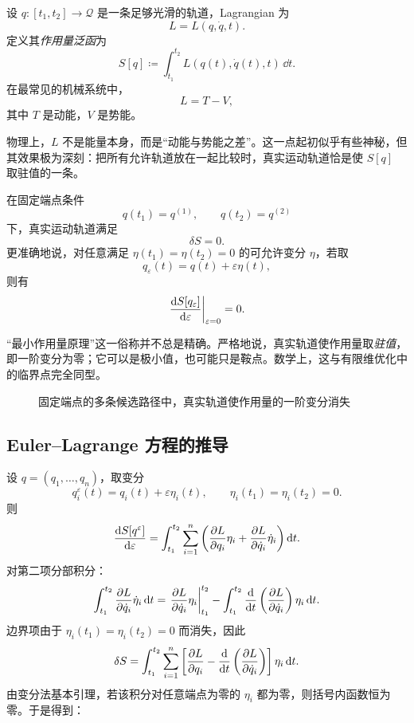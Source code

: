 \begin{definition}[作用量泛函]
设 $q:[t_1,t_2]\to \mathcal Q$ 是一条足够光滑的轨道，Lagrangian 为
\[
  L=L(q,\dot q,t).
\]
定义其\emph{作用量泛函}为
\[
  S[q]\coloneqq \int_{t_1}^{t_2} L(q(t),\dot q(t),t)\,\dd t.
\]
在最常见的机械系统中，
\[
  L=T-V,
\]
其中 $T$ 是动能，$V$ 是势能。
\end{definition}

物理上，$L$ 不是能量本身，而是“动能与势能之差”。这一点起初似乎有些神秘，但其效果极为深刻：把所有允许轨道放在一起比较时，真实运动轨道恰是使 $S[q]$ 取驻值的一条。

\begin{law}[Hamilton 原理]
在固定端点条件
\[
  q(t_1)=q^{(1)},\qquad q(t_2)=q^{(2)}
\]
下，真实运动轨道满足
\[
  \delta S =0.
\]
更准确地说，对任意满足 $\eta(t_1)=\eta(t_2)=0$ 的可允许变分 $\eta$，若取
\[
  q_\varepsilon(t)=q(t)+\varepsilon \eta(t),
\]
则有
\[
  \left.\dv{S[q_\varepsilon]}{\varepsilon}\right|_{\varepsilon=0}=0.
\]
\end{law}

\begin{remark}
“最小作用量原理”这一俗称并不总是精确。严格地说，真实轨道使作用量取\emph{驻值}，即一阶变分为零；它可以是极小值，也可能只是鞍点。数学上，这与有限维优化中的临界点完全同型。
\end{remark}

\begin{figure}[htbp]
\centering
{}
\caption{固定端点的多条候选路径中，真实轨道使作用量的一阶变分消失}
\end{figure}

\subsection{Euler--Lagrange 方程的推导}

设 $q=(q_1,\dots,q_n)$，取变分
\[
  q_i^\varepsilon(t)=q_i(t)+\varepsilon \eta_i(t),
  \qquad
  \eta_i(t_1)=\eta_i(t_2)=0.
\]
则
\[
  \dv{S[q^\varepsilon]}{\varepsilon}
  =\int_{t_1}^{t_2}\sum_{i=1}^n\left(
    \pdv{L}{q_i}\eta_i + \pdv{L}{\dot q_i}\dot\eta_i
  \right)\dd t.
\]
对第二项分部积分：
\[
  \int_{t_1}^{t_2}\pdv{L}{\dot q_i}\dot\eta_i\,\dd t
  =\eval{\pdv{L}{\dot q_i}\eta_i}_{t_1}^{t_2}
  -\int_{t_1}^{t_2}\dv{}{t}\left(\pdv{L}{\dot q_i}\right)\eta_i\,\dd t.
\]
边界项由于 $\eta_i(t_1)=\eta_i(t_2)=0$ 而消失，因此
\[
  \delta S
  =\int_{t_1}^{t_2}\sum_{i=1}^n
  \left[
    \pdv{L}{q_i}-\dv{}{t}\left(\pdv{L}{\dot q_i}\right)
  \right]\eta_i\,\dd t.
\]
由变分法基本引理，若该积分对任意端点为零的 $\eta_i$ 都为零，则括号内函数恒为零。于是得到：

